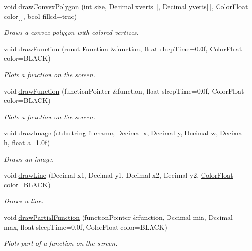 \begin{DoxyCompactItemize}
void \hyperlink{classtsgl_1_1_cartesian_canvas_abefc7f373711cdff2477d0665b37212f}{draw\+Convex\+Polygon} (int size, Decimal xverts\mbox{[}$\,$\mbox{]}, Decimal yverts\mbox{[}$\,$\mbox{]}, \hyperlink{structtsgl_1_1_color_float}{Color\+Float} color\mbox{[}$\,$\mbox{]}, bool filled=true)
\begin{DoxyCompactList}\small\item\em Draws a convex polygon with colored vertices. \end{DoxyCompactList}\item 
void \hyperlink{classtsgl_1_1_cartesian_canvas_aa8c215b817d95e3e05ff26f835470c41}{draw\+Function} (const \hyperlink{classtsgl_1_1_function}{Function} \&function, float sleep\+Time=0.\+0f, Color\+Float color=\+B\+L\+A\+C\+K)
\begin{DoxyCompactList}\small\item\em Plots a function on the screen. \end{DoxyCompactList}\item 
void \hyperlink{classtsgl_1_1_cartesian_canvas_acf5536fbf6dca6df1fec719e13630a02}{draw\+Function} (function\+Pointer \&function, float sleep\+Time=0.\+0f, Color\+Float color=\+B\+L\+A\+C\+K)
\begin{DoxyCompactList}\small\item\em Plots a function on the screen. \end{DoxyCompactList}\item 
void \hyperlink{classtsgl_1_1_cartesian_canvas_ab2f3e7633f4f05711083eba01b0a3f4e}{draw\+Image} (std\+::string filename, Decimal x, Decimal y, Decimal w, Decimal h, float a=1.\+0f)
\begin{DoxyCompactList}\small\item\em Draws an image. \end{DoxyCompactList}\item 
void \hyperlink{classtsgl_1_1_cartesian_canvas_ace015a630f1ff280b2ecd6a864cdc5e2}{draw\+Line} (Decimal x1, Decimal y1, Decimal x2, Decimal y2, \hyperlink{structtsgl_1_1_color_float}{Color\+Float} color=B\+L\+A\+C\+K)
\begin{DoxyCompactList}\small\item\em Draws a line. \end{DoxyCompactList}\item 
void \hyperlink{classtsgl_1_1_cartesian_canvas_a8b0d9607230111dd6bef5bf270394b03}{draw\+Partial\+Function} (function\+Pointer \&function, Decimal min, Decimal max, float sleep\+Time=0.\+0f, Color\+Float color=\+B\+L\+A\+C\+K)
\begin{DoxyCompactList}\small\item\em Plots part of a function on the screen. \end{DoxyCompactList}\item 

\end{DoxyCompactItemize}
